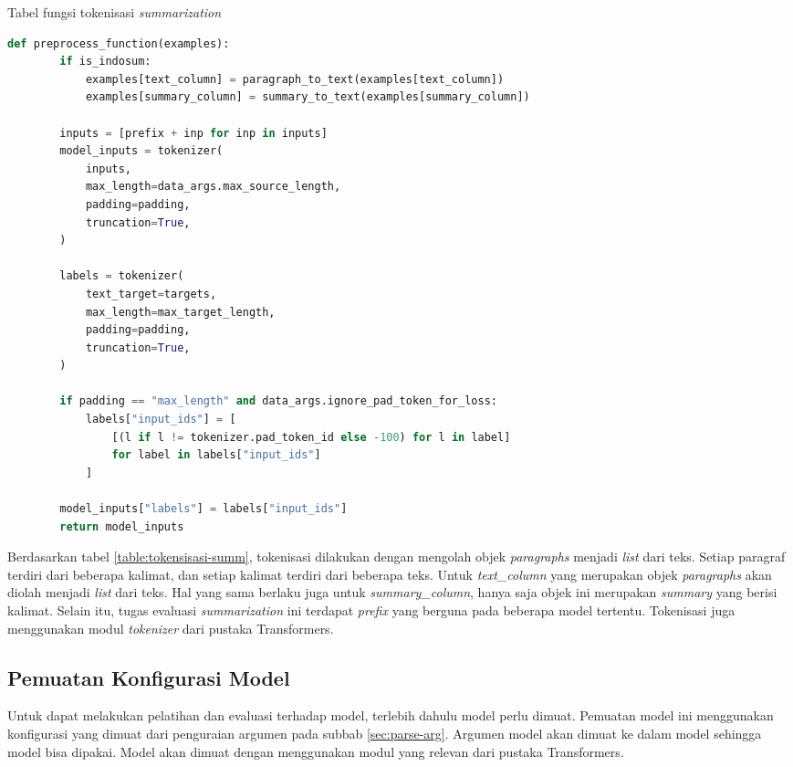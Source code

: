 \begin{table}[h]
    \caption{Tabel fungsi tokenisasi \textit{summarization}}
    \label{table:tokensisasi-summ}
    \begin{lstlisting}[language=python]
    def preprocess_function(examples):
        if is_indosum:
            examples[text_column] = paragraph_to_text(examples[text_column])
            examples[summary_column] = summary_to_text(examples[summary_column])

        inputs = [prefix + inp for inp in inputs]
        model_inputs = tokenizer(
            inputs,
            max_length=data_args.max_source_length,
            padding=padding,
            truncation=True,
        )

        labels = tokenizer(
            text_target=targets,
            max_length=max_target_length,
            padding=padding,
            truncation=True,
        )

        if padding == "max_length" and data_args.ignore_pad_token_for_loss:
            labels["input_ids"] = [
                [(l if l != tokenizer.pad_token_id else -100) for l in label]
                for label in labels["input_ids"]
            ]

        model_inputs["labels"] = labels["input_ids"]
        return model_inputs
    \end{lstlisting}
\end{table}

Berdasarkan tabel \ref{table:tokensisasi-summ}, tokenisasi dilakukan dengan mengolah objek \textit{paragraphs} menjadi \textit{list} dari teks. Setiap paragraf terdiri dari beberapa kalimat, dan setiap kalimat terdiri dari beberapa teks. Untuk \textit{text\_column} yang merupakan objek \textit{paragraphs} akan diolah menjadi \textit{list} dari teks. Hal yang sama berlaku juga untuk \textit{summary\_column}, hanya saja objek ini merupakan \textit{summary} yang berisi kalimat. Selain itu, tugas evaluasi \textit{summarization} ini terdapat \textit{prefix} yang berguna pada beberapa model tertentu. Tokenisasi juga menggunakan modul \textit{tokenizer} dari pustaka Transformers.

\subsection{Pemuatan Konfigurasi Model}

Untuk dapat melakukan pelatihan dan evaluasi terhadap model, terlebih dahulu model perlu dimuat. Pemuatan model ini menggunakan konfigurasi yang dimuat dari penguraian argumen pada subbab \ref{sec:parse-arg}. Argumen model akan dimuat ke dalam model sehingga model bisa dipakai. Model akan dimuat dengan menggunakan modul yang relevan dari pustaka Transformers.

